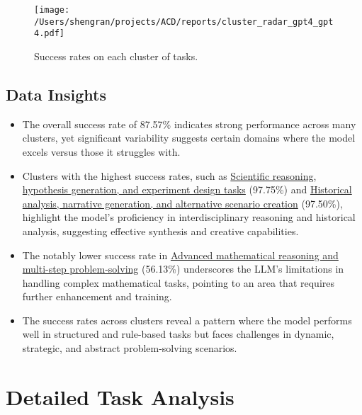 \documentclass[fleqn,10pt]{wlscirep}
\providecommand{\tightlist}{%
  \setlength{\itemsep}{0pt}\setlength{\parskip}{0pt}}
\begin{document}
\begin{figure}
\hypertarget{fig:radar}{%
\centering
\texttt{[image: /Users/shengran/projects/ACD/reports/cluster\_radar\_gpt4\_gpt4.pdf]}
\caption{Success rates on each cluster of tasks.}\label{fig:radar}
}
\end{figure}

\hypertarget{data-insights}{%
\subsection{Data Insights}\label{data-insights}}

\begin{itemize}
\tightlist
\item
  The overall success rate of 87.57\% indicates strong performance
  across many clusters, yet significant variability suggests certain
  domains where the model excels versus those it struggles with.
\item
  Clusters with the highest success rates, such as
  \protect\hyperlink{scientific-reasoning-hypothesis-generation-and-experiment-design-tasks}{Scientific
  reasoning, hypothesis generation, and experiment design tasks}
  (97.75\%) and
  \protect\hyperlink{historical-analysis-narrative-generation-and-alternative-scenario-creation}{Historical
  analysis, narrative generation, and alternative scenario creation}
  (97.50\%), highlight the model's proficiency in interdisciplinary
  reasoning and historical analysis, suggesting effective synthesis and
  creative capabilities.
\item
  The notably lower success rate in
  \protect\hyperlink{advanced-mathematical-reasoning-and-multi-step-problem-solving}{Advanced
  mathematical reasoning and multi-step problem-solving} (56.13\%)
  underscores the LLM's limitations in handling complex mathematical
  tasks, pointing to an area that requires further enhancement and
  training.
\item
  The success rates across clusters reveal a pattern where the model
  performs well in structured and rule-based tasks but faces challenges
  in dynamic, strategic, and abstract problem-solving scenarios.
\end{itemize}

\newpage

\hypertarget{detailed-task-analysis}{%
\section{Detailed Task Analysis}\label{detailed-task-analysis}}
\end{document}
